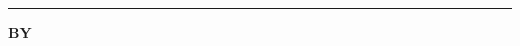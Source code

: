 \thispagestyle{prelims}

\begin{spacing}{1.15}

\begin{center}
{\fontsize{16}{19}\selectfont\bfseries \SynopsisTitle\par}
\rule{\textwidth}{1pt}                 %

\vspace{10pt}                          %
{\fontsize{14}{17}\selectfont\bfseries BY\par}
\vspace{4pt}                           %
{\fontsize{14}{17}\selectfont\bfseries \ScholarName\par}
\end{center}


\end{spacing}
